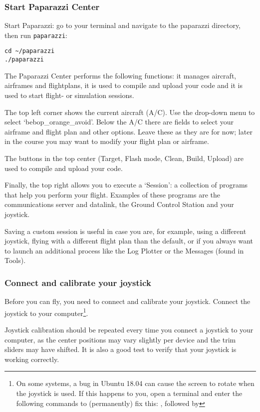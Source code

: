 \subsubsection*{Start Paparazzi Center}
Start Paparazzi: go to your terminal and navigate to the paparazzi directory, then run \texttt{paparazzi}:

\begin{lstlisting}[style=Bash]
cd ~/paparazzi
./paparazzi
\end{lstlisting}

The Paparazzi Center performs the following functions: it manages aircraft, airframes and flightplans, it is used to compile and upload your code and it is used to start flight- or simulation sessions.

The top left corner shows the current aircraft (A/C). Use the drop-down menu to select `bebop\_orange\_avoid'.
Below the A/C there are fields to select your airframe and flight plan and other options. Leave these as they are for now; later in the course you may want to modify your flight plan or airframe.

The buttons in the top center (Target, Flash mode, Clean, Build, Upload) are used to compile and upload your code.

Finally, the top right allows you to execute a `Session': a collection of programs that help you perform your flight. Examples of these programs are the communications server and datalink, the Ground Control Station and your joystick.

Saving a custom session is useful in case you are, for example, using a different joystick, flying with a different flight plan than the default, or if you always want to launch an additional process like the Log Plotter or the Messages (found in Tools).

\subsubsection*{Connect and calibrate your joystick}
Before you can fly, you need to connect and calibrate your joystick.
Connect the joystick to your computer\footnote{On some systems, a bug in Ubuntu 18.04 can cause the screen to rotate when the joystick is used. If this happens to you, open a terminal and enter the following commands to (permanently) fix this: , followed by }.

Joystick calibration should be repeated every time you connect a joystick to your computer, as the center positions may vary slightly per device and the trim sliders may have shifted. It is also a good test to verify that your joystick is working correctly.

